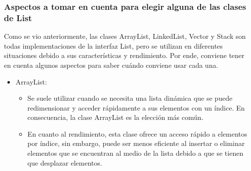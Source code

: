 \documentclass{report}
\begin{document}
\subsubsection*{Aspectos a tomar en cuenta para elegir alguna de las clases de List}
Como se vio anteriormente, las clases ArrayList, LinkedList, Vector y Stack son todas implementaciones de la interfaz List, pero se utilizan en diferentes situaciones debido a sus características y rendimiento. Por ende, conviene tener en cuenta algunos aspectos para saber cuándo conviene usar cada una.
\begin{itemize}
    \item ArrayList:
    \begin{itemize}
     \item Se suele utilizar cuando se necesita una lista dinámica que se puede redimensionar y acceder rápidamente a sus elementos con un índice. En consecuencia, la clase ArrayList es la elección más común.
      \item En cuanto al rendimiento, esta clase ofrece un acceso rápido a elementos por índice, sin embargo, puede ser menos eficiente al insertar o eliminar elementos que se encuentran al medio de la lista debido a que se tienen que desplazar elementos.
    \end{itemize}



\end{itemize}
\end{document}

